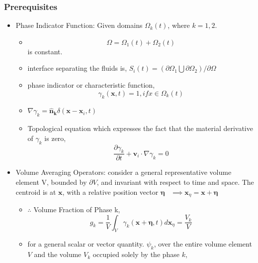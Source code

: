 \documentclass[11pt]{article}
\begin{document}
\subsubsection{Prerequisites}
\begin{itemize}
	\item Phase Indicator Function: Given domains $\Omega_{k}(t)$, where $k=1,2$.
		\begin{itemize}
		\item \begin{equation}
				\Omega = \Omega_{1}(t) + \Omega_{2}(t) \end{equation} is constant.
		\item interface separating the fluids is, $S_{i}(t) = (\partial \Omega_{1} \bigcup \partial \Omega_{2}) / \partial \Omega$
		\item phase indicator or characteristic function,
			\begin{equation}
					\gamma_{k}(\mathbf{x}, t) = 1, if x \in \Omega_{k}(t)
			\end{equation}
		\item \begin{math} \nabla \gamma_{k} = \mathbf{\hat{n}_k} \delta (\mathbf{x} - \mathbf{x}_{i}, t) \end{math}
		\item Topological equation which expresses the fact that the material derivative of $\gamma_{k}$ is zero, 
			\begin{equation}
				\frac{\partial \gamma_{k}}{\partial t} + \mathbf{v}_{i} \cdot \nabla \gamma_{k} = 0
			\end{equation}
		\end{itemize}
	\item Volume Averaging Operators: consider a general representative volume element V, bounded by $\partial V$, and invariant with respect to time and space. The centroid is at $\mathbf{x}$, with a relative position vector $\mathbf{\eta}$~\newline
			$\implies \mathbf{x}_{\eta} = \mathbf{x} + \mathbf{\eta}$
			\begin{itemize}
				\item $ \therefore$ Volume Fraction of Phase k,~\newline
						\begin{equation}
							g_{k} = \frac{1}{V} \int_{V} \gamma_{k}(\mathbf{x} + \mathbf{\eta}, t) d\mathbf{x}_{\eta} = \frac{V_{k}}{V}
						\end{equation}
				\item for a general scalar or vector quantity. $\psi_{k}$, over the entire volume element $V$ and the volume $V_{k}$ occupied solely by the phase $k$,~\newline

\end{itemize}
\end{itemize}
\end{document}

